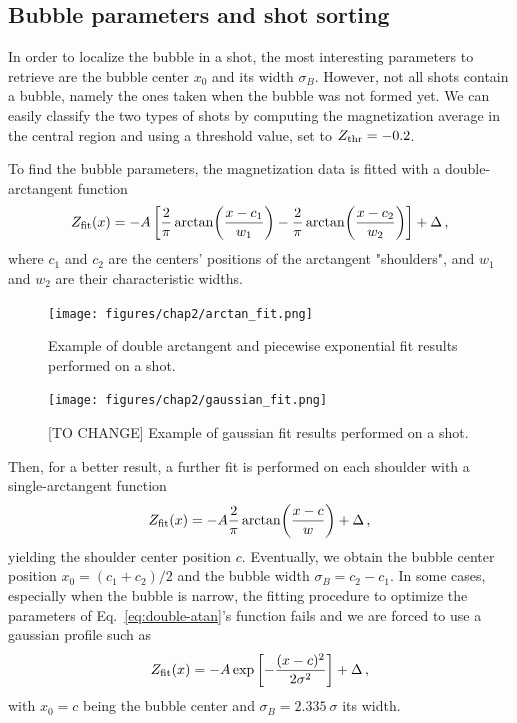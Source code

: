 \subsection{Bubble parameters and shot sorting}
In order to localize the bubble in a shot, the most interesting parameters to retrieve are the bubble center $x_0$ and its width $\sigma_B$. However, not all shots contain a bubble, namely the ones taken when the bubble was not formed yet. We can easily classify the two types of shots by computing the magnetization average in the central region and using a threshold value, set to $Z_{\rm thr} = -0.2$. 

To find the bubble parameters, the magnetization data is fitted with a double-arctangent function
\begin{equation}
    Z_{\rm fit}(x) = -A \left[\frac{2}{\pi}\arctan(\frac{x-c_1}{w_1}) - \frac{2}{\pi}\arctan(\frac{x-c_2}{w_2})\right] + \Delta\, ,
    \label{eq:double-atan}
\end{equation}
where $c_1$ and $c_2$ are the centers' positions of the arctangent "shoulders", and $w_1$ and $w_2$ are their characteristic widths. 
\begin{figure}[h!]
    \centering
    \begin{minipage}[t]{0.47 \textwidth}
        \centering
        \texttt{[image: figures/chap2/arctan\_fit.png]}
        \caption{Example of double arctangent and piecewise exponential fit results performed on a shot.}
        \label{fig:atan-fit}
    \end{minipage}
    \hspace{0.02\textwidth}
    \begin{minipage}[t]{0.47 \textwidth}
        \centering
        \texttt{[image: figures/chap2/gaussian\_fit.png]}
        \caption{[TO CHANGE] Example of gaussian fit results performed on a shot.}
        \label{fig:gaussian-fit}
    \end{minipage}
\end{figure}
Then, for a better result, a further fit is performed on each shoulder with a single-arctangent function
\begin{equation*}
    Z_{\rm fit}(x) = -A \frac{2}{\pi}\arctan(\frac{x-c}{w}) + \Delta\, ,
\end{equation*}
yielding the shoulder center position $c$. Eventually, we obtain the bubble center position $x_0 = (c_1 + c_2)/2$ and the bubble width $\sigma_B = c_2 - c_1$.
In some cases, especially when the bubble is narrow, the fitting procedure to optimize the parameters of Eq.\ \eqref{eq:double-atan}'s function fails and we are forced to use a gaussian profile such as
\begin{equation*}
    Z_{\rm fit}(x) = - A \exp\left[-\frac{(x-c)^2}{2\sigma^2}\right] + \Delta\, ,
\end{equation*}
with $x_0 = c$ being the bubble center and $\sigma_B = \num{2.335}\ \sigma$ its width.

